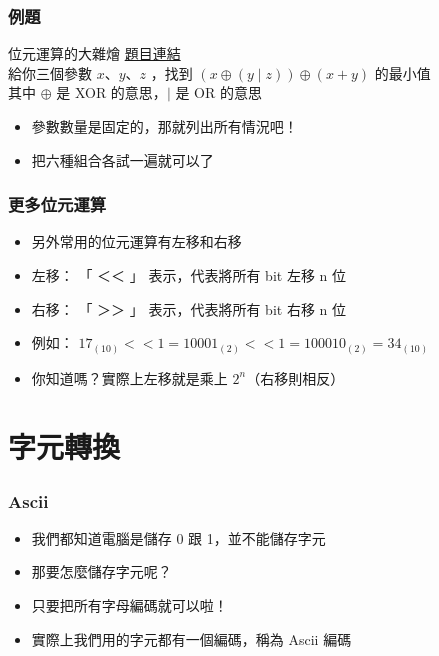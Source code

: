 \documentclass{beamer}
\begin{document}
\begin{frame}
    \frametitle{例題}
    \begin{block}{位元運算的大雜燴}
        \href{https://codeforces.com/group/S6XjkGb6qB/contest/403070/problem/B}{題目連結}\\
        給你三個參數 $x$、$y$、$z$ ，找到 $(x \oplus (y \mid z)) \oplus (x+y)$ 的最小值\\
        其中 $\oplus$ 是 XOR 的意思，$\mid$ 是 OR 的意思
    \end{block}
    \begin{itemize}
        \item<2-> 參數數量是固定的，那就列出所有情況吧！
        \item<2-> 把六種組合各試一遍就可以了
    \end{itemize}
\end{frame}

\begin{frame}
    \frametitle{更多位元運算}
    \begin{itemize}
        \item 另外常用的位元運算有左移和右移
        \vspace{0.5cm}
        \item<2-> 左移： 「 ＜＜ 」 表示，代表將所有 bit 左移 n 位
        \item<2-> 右移： 「 ＞＞ 」 表示，代表將所有 bit 右移 n 位
        \vspace{0.5cm}
        \item<3-> 例如： $17_{(10)} << 1 = 10001_{(2)} << 1 = 100010_{(2)} = 34_{(10)}$
        \item<3->你知道嗎？實際上左移就是乘上 $2^n$（右移則相反）
    \end{itemize}
\end{frame}

\section{字元轉換}

\begin{frame}
    \frametitle{Ascii}
    \begin{itemize}
        \item 我們都知道電腦是儲存 0 跟 1，並不能儲存字元
        \item 那要怎麼儲存字元呢？
        \item<2-> 只要把所有字母編碼就可以啦！
        \item<2-> 實際上我們用的字元都有一個編碼，稱為 Ascii 編碼
    \end{itemize}
\end{frame}
\end{document}
